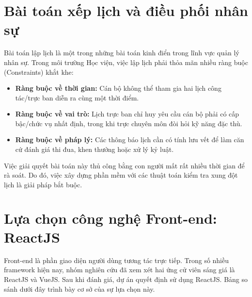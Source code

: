 \documentclass[18pt,a4paper]{report}
\begin{document}
\section{Bài toán xếp lịch và điều phối nhân sự}
Bài toán lập lịch là một trong những bài toán kinh điển trong lĩnh vực quản lý nhân sự. Trong môi trường Học viện, việc lập lịch phải thỏa mãn nhiều ràng buộc (Constraints) khắt khe:
\begin{itemize}[leftmargin=1.2cm]
    \item \textbf{Ràng buộc về thời gian:} Cán bộ không thể tham gia hai lịch công tác/trực ban diễn ra cùng một thời điểm.
    \item \textbf{Ràng buộc về vai trò:} Lịch trực ban chỉ huy yêu cầu cán bộ phải có cấp bậc/chức vụ nhất định, trong khi trực chuyên môn đòi hỏi kỹ năng đặc thù.
    \item \textbf{Ràng buộc về pháp lý:} Các thông báo lịch cần có tính lưu vết để làm căn cứ đánh giá thi đua, khen thưởng hoặc xử lý kỷ luật.
\end{itemize}

Việc giải quyết bài toán này thủ công bằng con người mất rất nhiều thời gian để rà soát. Do đó, việc xây dựng phần mềm với các thuật toán kiểm tra xung đột lịch là giải pháp bắt buộc.

\section{Lựa chọn công nghệ Front-end: ReactJS}
Front-end là phần giao diện người dùng tương tác trực tiếp. Trong số nhiều framework hiện nay, nhóm nghiên cứu đã xem xét hai ứng cử viên sáng giá là ReactJS và VueJS. Sau khi đánh giá, dự án quyết định sử dụng ReactJS. Bảng so sánh dưới đây trình bày cơ sở của sự lựa chọn này.
\end{document}
